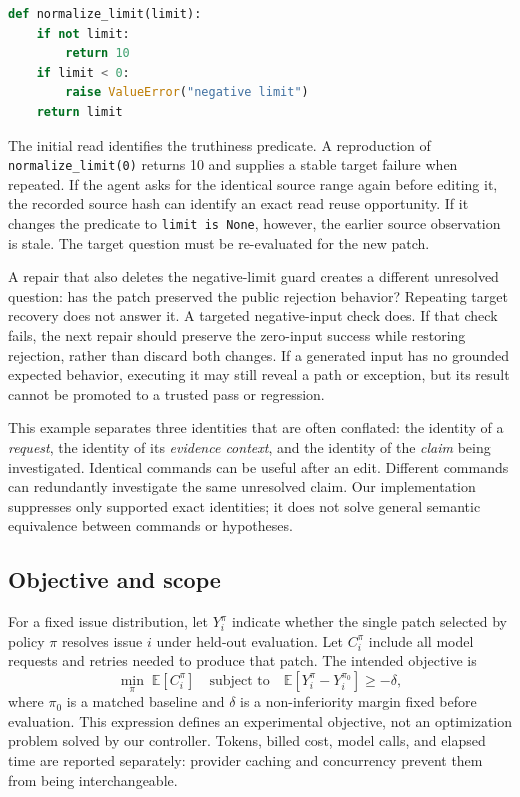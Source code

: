 \documentclass[acmsmall,screen,review,anonymous]{acmart}
\begin{document}
\begin{lstlisting}[language=Python,caption={Illustrative boundary bug with distinct target and preservation questions.},label=lst:example]
def normalize_limit(limit):
    if not limit:
        return 10
    if limit < 0:
        raise ValueError("negative limit")
    return limit
\end{lstlisting}

The initial read identifies the truthiness predicate. A reproduction of \texttt{normalize\_limit(0)} returns 10 and supplies a stable target failure when repeated. If the agent asks for the identical source range again before editing it, the recorded source hash can identify an exact read reuse opportunity. If it changes the predicate to \texttt{limit is None}, however, the earlier source observation is stale. The target question must be re-evaluated for the new patch.

A repair that also deletes the negative-limit guard creates a different unresolved question: has the patch preserved the public rejection behavior? Repeating target recovery does not answer it. A targeted negative-input check does. If that check fails, the next repair should preserve the zero-input success while restoring rejection, rather than discard both changes. If a generated input has no grounded expected behavior, executing it may still reveal a path or exception, but its result cannot be promoted to a trusted pass or regression.

This example separates three identities that are often conflated: the identity of a \emph{request}, the identity of its \emph{evidence context}, and the identity of the \emph{claim} being investigated. Identical commands can be useful after an edit. Different commands can redundantly investigate the same unresolved claim. Our implementation suppresses only supported exact identities; it does not solve general semantic equivalence between commands or hypotheses.

\subsection{Objective and scope}
For a fixed issue distribution, let $Y_i^\pi$ indicate whether the single patch selected by policy $\pi$ resolves issue $i$ under held-out evaluation. Let $C_i^\pi$ include all model requests and retries needed to produce that patch. The intended objective is
\begin{equation}
 \min_\pi\;\mathbb{E}[C_i^\pi]
 \quad\text{subject to}\quad
 \mathbb{E}[Y_i^\pi-Y_i^{\pi_0}]\geq-\delta,
 \label{eq:objective}
\end{equation}
where $\pi_0$ is a matched baseline and $\delta$ is a non-inferiority margin fixed before evaluation. This expression defines an experimental objective, not an optimization problem solved by our controller. Tokens, billed cost, model calls, and elapsed time are reported separately: provider caching and concurrency prevent them from being interchangeable.
\end{document}
